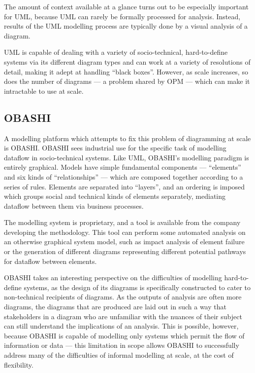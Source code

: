 \documentclass{article}
\begin{document}
The amount of context available at a glance turns out to be especially important
for UML, because UML can rarely be formally processed for analysis. Instead,
results of the UML modelling process are typically done by a visual analysis of
a diagram.\par

UML is capable of dealing with a variety of socio-technical, hard-to-define
systems via its different diagram types and can work at a variety of resolutions
of detail, making it adept at handling ``black boxes''. However, as scale
increases, so does the number of diagrams --- a problem shared by OPM --- which
can make it intractable to use at scale.\par

\subsection{OBASHI}
\label{subsec:obashi}
A modelling platform which attempts to fix this problem of diagramming at
scale is OBASHI\cite{obashi_methodology}. OBASHI sees industrial use for the
specific task of modelling dataflow in socio-technical systems. Like UML,
OBASHI's modelling paradigm is entirely graphical. Models have simple
fundamental components --- ``elements'' and six kinds of ``relationships'' ---
which are composed together according to a series of rules. Elements are
separated into ``layers'', and an ordering is imposed which groups social and
technical kinds of elements separately, mediating dataflow between them via
business processes.\par

The modelling system is proprietary, and a tool is available from the company
developing the methodology. This tool can perform some automated analysis on an
otherwise graphical system model, such as impact analysis of element failure or
the generation of different diagrams representing different potential pathways
for dataflow between elements.\par

OBASHI takes an interesting perspective on the difficulties of modelling
hard-to-define systems, as the design of its diagrams is specifically
constructed to cater to non-technical recipients of diagrams. As the outputs of
analysis are often more diagrams, the diagrams that are produced are laid out in
such a way that stakeholders in a diagram who are unfamiliar with the nuances of
their subject can still understand the implications of an analysis. This is
possible, however, because OBASHI is capable of modelling only systems which
permit the flow of information or data --- this limitation in scope allows
OBASHI to successfully address many of the difficulties of informal modelling at
scale, at the cost of flexibility.\par
\end{document}
